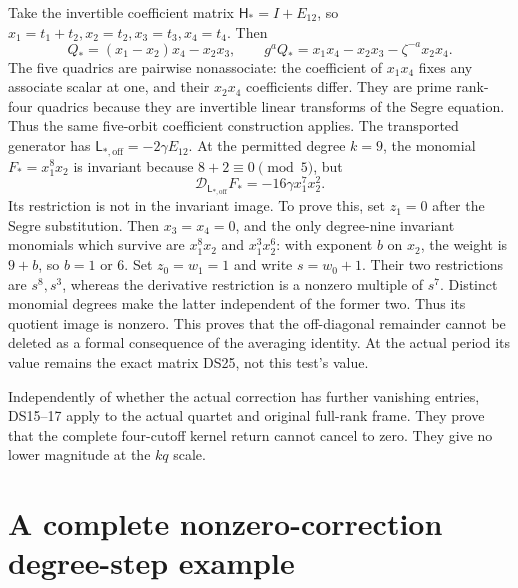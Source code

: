 \documentclass[11pt]{article}
\newcommand{\calD}{\mathscr D}
\begin{document}
Take the invertible coefficient matrix
\(\mathsf H_*=I+E_{12}\), so
\(x_1=t_1+t_2,x_2=t_2,x_3=t_3,x_4=t_4\). Then
\[
Q_*=(x_1-x_2)x_4-x_2x_3,
\qquad g^aQ_*=x_1x_4-x_2x_3-\zeta^{-a}x_2x_4.
\]
The five quadrics are pairwise nonassociate: the coefficient of
\(x_1x_4\) fixes any associate scalar at one, and their
\(x_2x_4\) coefficients differ. They are prime rank-four quadrics
because they are invertible linear transforms of the Segre equation.
Thus the same five-orbit coefficient construction applies.
The transported generator has
\(\mathsf L_{*,\mathrm{off}}=-2\gamma E_{12}\).
At the permitted degree \(k=9\), the monomial
\(F_*=x_1^8x_2\) is invariant because \(8+2\equiv0\pmod5\), but
\[
\calD_{\mathsf L_{*,\mathrm{off}}}F_*
=-16\gamma x_1^7x_2^2.
\]
Its restriction is not in the invariant image. To prove this, set
\(z_1=0\) after the Segre substitution. Then \(x_3=x_4=0\), and
the only degree-nine invariant monomials which survive are
\(x_1^8x_2\) and \(x_1^3x_2^6\): with exponent \(b\) on
\(x_2\), the weight is \(9+b\), so \(b=1\) or \(6\).
Set \(z_0=w_1=1\) and write \(s=w_0+1\). Their two restrictions
are \(s^8,s^3\), whereas the derivative restriction is a nonzero
multiple of \(s^7\). Distinct monomial degrees make the latter
independent of the former two. Thus its quotient image is nonzero.
This proves that the off-diagonal remainder cannot be deleted as a
formal consequence of the averaging identity. At the actual period
its value remains the exact matrix DS25, not this test's value.

Independently of whether the actual correction has further vanishing
entries, DS15--17 apply to the actual quartet and original full-rank
frame. They prove that the complete four-cutoff kernel return cannot
cancel to zero. They give no lower magnitude at the \(kq\) scale.

\section{A complete nonzero-correction degree-step example}
\end{document}
